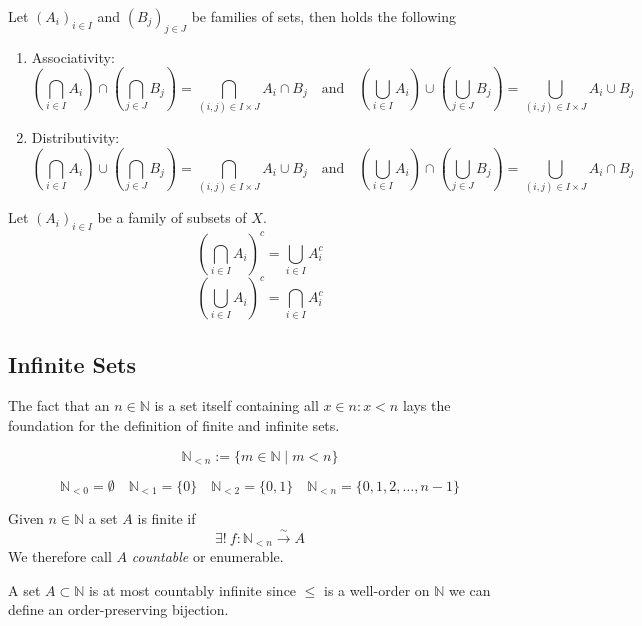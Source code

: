\begin{proposition}
   Let \((A_i)_{i \in I}\) and \((B_j)_{j \in J}\) be families of sets, then holds the following

   \begin{enumerate}[label=\roman*, align=Center]
      \item Associativity:
         \[\left(\bigcap_{i \in I} A_i\right) \cap \left(\bigcap_{j \in J} B_j\right) = \bigcap_{(i, j) \in I \times J} A_i \cap B_j \quad\text{and}\quad \left(\bigcup_{i \in I} A_i\right) \cup \left(\bigcup_{j \in J} B_j\right) = \bigcup_{(i, j) \in I \times J} A_i \cup B_j\]
      \item Distributivity:
         \[\left(\bigcap_{i \in I} A_i\right) \cup \left(\bigcap_{j \in J} B_j\right) = \bigcap_{(i, j) \in I \times J} A_i \cup B_j \quad\text{and}\quad \left(\bigcup_{i \in I} A_i\right) \cap \left(\bigcup_{j \in J} B_j\right) = \bigcup_{(i, j) \in I \times J} A_i \cap B_j\]
   \end{enumerate}
\end{proposition}

\begin{theorem}
   Let \((A_i)_{i \in I}\) be a family of subsets of \(X\).
   \begin{equation}\label{eq:de_morgan_fam_comp}
      \left(\bigcap_{i \in I} A_i \right)^c = \bigcup_{i \in I} A_i^c
   \end{equation}
   \[\left(\bigcup_{i \in I} A_i \right)^c = \bigcap_{i \in I} A_i^c\]
\end{theorem}

\subsection{Infinite Sets}
The fact that an \(n \in \mathbb{N}\) is a set itself containing all \(x \in n: x < n\) lays the foundation for the definition of finite and infinite sets.

\begin{definition}[\(\mathbb{N}_{<n}\)]
   \[\mathbb{N}_{<n} := \{m \in \mathbb{N} \mid m < n\}\]
\end{definition}
\begin{example}
   \[\mathbb{N}_{<0} = \emptyset \quad \mathbb{N}_{<1} = \{0\} \quad \mathbb{N}_{<2} = \{0, 1\} \quad \mathbb{N}_{<n} = \{0, 1, 2, \ldots, n - 1\}\]
\end{example}

\begin{definition}\label{def:finite_set}
   Given \(n \in \mathbb{N}\) a set \(A\) is finite if
   \[\exists!~f: \mathbb{N}_{<n} \xrightarrow{\sim} A\]
   We therefore call \(A\) \emph{countable} or enumerable.
\end{definition}
\begin{remark}
   A set \(A \subset \mathbb{N}\) is at most countably infinite since \(\leq\) is a well-order on \(\mathbb{N}\) we can define an order-preserving bijection.
\end{remark}

